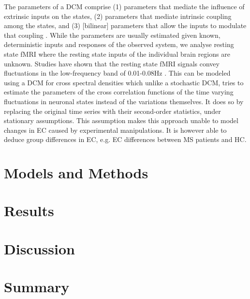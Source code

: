 \documentclass[a4paper,conference]{IEEEtran}
\begin{document}
The parameters of a DCM comprise (1) parameters that mediate the influence of extrinsic inputs on the states, (2) parameters that mediate intrinsic coupling among the states, and (3) [bilinear] parameters that allow the inputs to modulate that coupling \cite{dcm}. While the parameters are usually estimated given known, deterministic inputs and responses of the observed system, we analyse resting state fMRI where the resting state inputs of the individual brain regions are unknown. Studies have shown that the resting state fMRI signals convey fluctuations in the low-frequency band of 0.01-0.08Hz \cite{csd_for_dcm, biswal1995functional, cordes2001frequencies}. This can be modeled using a DCM for cross spectral densities \cite{resting_sate_dcm} which unlike a stochastic DCM, tries to estimate the parameters of the cross correlation functions of the time varying fluctuations in neuronal states instead of the variations themselves. It does so by replacing the original time series with their second-order statistics, under stationary assumptions. This assumption makes this approach unable to model changes in EC caused by experimental manipulations. It is however able to deduce group differences in EC, e.g. EC differences between MS patients and HC.

\newpage
\begin{multicols}{2}


\section{Models and Methods}

\section{Results}

\section{Discussion}

\section{Summary}

\end{multicols}



\end{document}
